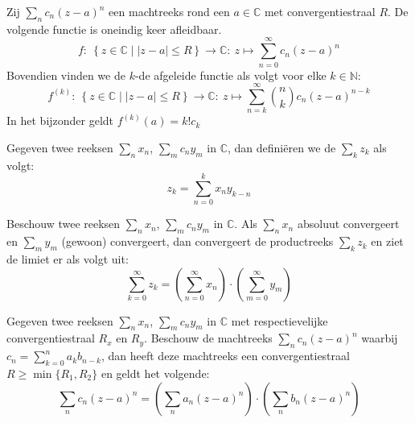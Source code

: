 \documentclass[main.tex]{subfiles}
\begin{document}
\begin{bgev}
  Zij $\sum_{n}c_{n}(z-a)^{n}$ een machtreeks rond een $a\in \mathbb{C}$ met convergentiestraal $R$.
  De volgende functie is oneindig keer afleidbaar.
  \[ f:\ \left\{ z \in \mathbb{C} \mid |z-a| \le R \right\} \rightarrow \mathbb{C}:\ z \mapsto \sum_{n=0}^{\infty}c_{n}(z-a)^{n}  \]
  Bovendien vinden we de $k$-de afgeleide functie als volgt voor elke $k\in \mathbb{N}$:
  \[ f^{(k)}:\ \left\{ z \in \mathbb{C} \mid |z-a| \le R \right\} \rightarrow \mathbb{C}:\ z \mapsto \sum_{n=k}^{\infty}\binom{n}{k}c_{n}(z-a)^{n-k}  \]
  In het bijzonder geldt $f^{(k)}(a) = k!c_{k}$
\end{bgev}

\begin{de}
  Gegeven twee reeksen $\sum_{n}x_{n}$, $\sum_{m}c_{n}y_{m}$ in $\mathbb{C}$, dan defini\"eren we de  $\sum_{k}z_{k}$ als volgt:
  \[ z_{k} = \sum_{n=0}^{k}x_{n}y_{k-n} \]
\end{de}


\begin{bst}
  Beschouw twee reeksen $\sum_{n}x_{n}$, $\sum_{m}c_{n}y_{m}$ in $\mathbb{C}$.
  Als $\sum_{n}x_{n}$ absoluut convergeert en $\sum_{m}y_{m}$ (gewoon) convergeert, dan convergeert de productreeks $\sum_{k}z_{k}$ en ziet de limiet er als volgt uit:
  \[ \sum_{k=0}^{\infty}z_{k} = \left(\sum_{n=0}^{\infty}x_{n}\right) \cdot \left(\sum_{m=0}^{\infty}y_{m}\right) \]
\end{bst}

\begin{bpr}
  Gegeven twee reeksen $\sum_{n}x_{n}$, $\sum_{m}c_{n}y_{m}$ in $\mathbb{C}$ met respectievelijke convergentiestraal $R_{x}$ en $R_{y}$.
  Beschouw de machtreeks $\sum_{n}c_{n}(z-a)^{n}$ waarbij $c_{n} = \sum_{k=0}^{n}a_{k}b_{n-k}$, dan heeft deze machtreeks een convergentiestraal $R \ge \min\{R_{1},R_{2}\}$ en geldt het volgende:
  \[ \sum_{n}c_{n}(z-a)^{n} = \left( \sum_{n}a_{n}(z-a)^{n}\right)\cdot \left( \sum_{n}b_{n}(z-a)^{n}\right) \]
\end{bpr}
\end{document}
